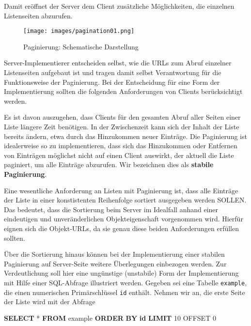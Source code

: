 \documentclass[,a4paper]{article}
\makeatletter
\newenvironment{Shaded}{}{}
\newcommand{\KeywordTok}[1]{\textcolor[rgb]{0.00,0.44,0.13}{\textbf{{#1}}}}
\newcommand{\DecValTok}[1]{\textcolor[rgb]{0.25,0.63,0.44}{{#1}}}
\newcommand{\NormalTok}[1]{{#1}}
\def\maxwidth{\ifdim\Gin@nat@width>\linewidth\linewidth
\else\Gin@nat@width\fi}
\let\Oldincludegraphics\includegraphics
\renewcommand{\includegraphics}[1]{\Oldincludegraphics[width=\maxwidth]{#1}}
\makeatother
\begin{document}
Damit eröffnet der Server dem Client zusätzliche Möglichkeiten, die
einzelnen Listenseiten abzurufen.

\begin{figure}[htbp]
\centering
\texttt{[image: images/pagination01.png]}
\caption{Paginierung: Schematische Darstellung}
\end{figure}

Server-Implementierer entscheiden selbst, wie die URLs zum Abruf
einzelner Listenseiten aufgebaut ist und tragen damit selbst
Verantwortung für die Funktionsweise der Paginierung. Bei der
Entscheidung für eine Form der Implementierung sollten die folgenden
Anforderungen von Clients berücksichtigt werden.

Es ist davon auszugehen, dass Clients für den gesamten Abruf aller
Seiten einer Liste längere Zeit benötigen. In der Zwischenzeit kann sich
der Inhalt der Liste bereits ändern, etwa durch das Hinzukommen neuer
Einträge. Die Paginierung ist idealerweise so zu implementieren, dass
sich das Hinzukommen oder Entfernen von Einträgen möglichst nicht auf
einen Client auswirkt, der aktuell die Liste paginiert, um alle Einträge
abzurufen. Wir bezeichnen dies als \textbf{stabile Paginierung}.

Eine wesentliche Anforderung an Listen mit Paginierung ist, dass alle
Einträge der Liste in einer konstistenten Reihenfolge sortiert
ausgegeben werden SOLLEN. Das bedeutet, dass die Sortierung beim Server
im Idealfall anhand einer eindeutigen und unveränderlichen
Objekteigenschaft vorgenommen wird. Hierfür eignen sich die Objekt-URLs,
da sie genau diese beiden Anforderungen erfüllen sollten.

Über die Sortierung hinaus können bei der Implementierung einer stabilen
Paginierung auf Server-Seite weitere Überlegungen einbezogen werden. Zur
Verdeutlichung soll hier eine ungünstige (unstabile) Form der
Implementierung mit Hilfe einer SQL-Abfrage illustriert werden. Gegeben
sei eine Tabelle \texttt{example}, die einen numerischen Primärschlüssel
\texttt{id} enthält. Nehmen wir an, die erste Seite der Liste wird mit
der Abfrage

\begin{Shaded}
\begin{Highlighting}[]
\KeywordTok{SELECT} \NormalTok{* }\KeywordTok{FROM} \NormalTok{example }\KeywordTok{ORDER} \KeywordTok{BY} \KeywordTok{id} \KeywordTok{LIMIT} \DecValTok{10} \NormalTok{OFFSET }\DecValTok{0}
\end{Highlighting}
\end{Shaded}
\end{document}
